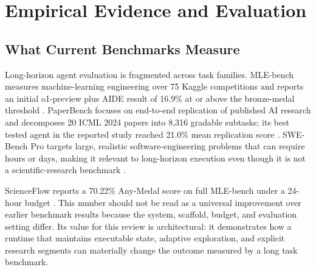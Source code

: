 \documentclass[manuscript,screen]{acmart}
\begin{document}
\section{Empirical Evidence and Evaluation}\label{sec:evidence}

\subsection{What Current Benchmarks Measure}
Long-horizon agent evaluation is fragmented across task families. MLE-bench measures machine-learning engineering over 75 Kaggle competitions and reports an initial o1-preview plus AIDE result of 16.9\% at or above the bronze-medal threshold \cite{chan2024mlebench}. PaperBench focuses on end-to-end replication of published AI research and decomposes 20 ICML 2024 papers into 8,316 gradable subtasks; its best tested agent in the reported study reached 21.0\% mean replication score \cite{starace2025paperbench}. SWE-Bench Pro targets large, realistic software-engineering problems that can require hours or days, making it relevant to long-horizon execution even though it is not a scientific-research benchmark \cite{deng2025swebenchpro}.

ScienceFlow reports a 70.22\% Any-Medal score on full MLE-bench under a 24-hour budget \cite{zhao2026scienceflow}. This number should not be read as a universal improvement over earlier benchmark results because the system, scaffold, budget, and evaluation setting differ. Its value for this review is architectural: it demonstrates how a runtime that maintains executable state, adaptive exploration, and explicit research segments can materially change the outcome measured by a long task benchmark.
\end{document}
